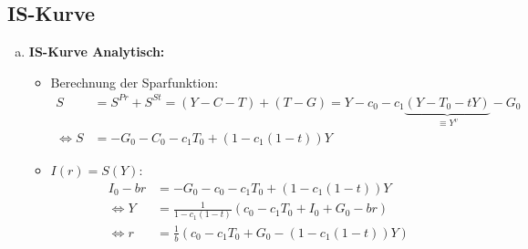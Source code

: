 \documentclass{scrartcl}
\begin{document}
\subsection{IS-Kurve}
\begin{enumerate}[(a)]
\item \textbf{IS-Kurve Analytisch:}
\begin{itemize}
\item Berechnung der Sparfunktion:
\begin{align*}
  S &= S^{Pr} + S^{St} = (Y-C-T) + (T-G) = Y-c_{0} -c_1\underbrace{(Y-T_{0} - t Y)}_{\equiv Y^v} - G_{0}\\
  \Leftrightarrow S&= -G_{0} - C_{0} - c_1 T_{0} + (1-c_1(1-t))Y
\end{align*}
\item $I(r)=S(Y):$
\begin{align*}
  I_{0} - b r &= -G_{0} - c_{0} - c_1 T_{0} + (1-c_1(1-t))Y\\
  \Leftrightarrow Y &= \frac{1}{1-c_1(1-t)}(c_{0} - c_1 T_{0} + I_{0} + G_{0} - b r)\\
  \Leftrightarrow r &=\frac{1}{b}(c_{0} -c_1 T_{0} + G_{0} - (1-c_1(1-t))Y)
\end{align*}
\end{itemize}


\end{enumerate}
\end{document}
